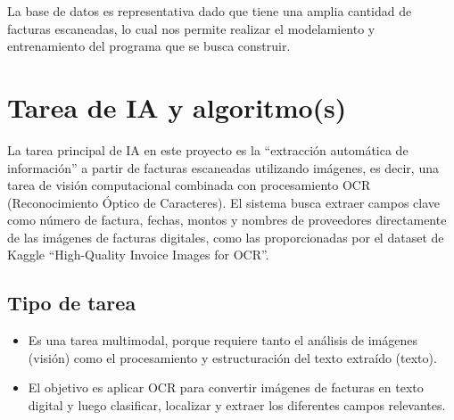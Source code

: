 \documentclass[11pt,letterpaper]{article}
\begin{document}
	La base de datos es representativa dado que tiene una amplia cantidad de facturas escaneadas, lo cual nos permite realizar el modelamiento y entrenamiento del programa que se busca construir.
	
	\section{Tarea de IA y algoritmo(s)}
	La tarea principal de IA en este proyecto es la “extracción automática de información” a partir de facturas escaneadas utilizando imágenes, es decir, una tarea de visión computacional combinada con procesamiento OCR (Reconocimiento Óptico de Caracteres). El sistema busca extraer campos clave como número de factura, fechas, montos y nombres de proveedores directamente de las imágenes de facturas digitales, como las proporcionadas por el dataset de Kaggle “High-Quality Invoice Images for OCR”.
	
	\subsection*{Tipo de tarea}
	\begin{itemize}
		\item Es una tarea multimodal, porque requiere tanto el análisis de imágenes (visión) como el procesamiento y estructuración del texto extraído (texto).
		\item El objetivo es aplicar OCR para convertir imágenes de facturas en texto digital y luego clasificar, localizar y extraer los diferentes campos relevantes.
	\end{itemize}
	
\end{document}
